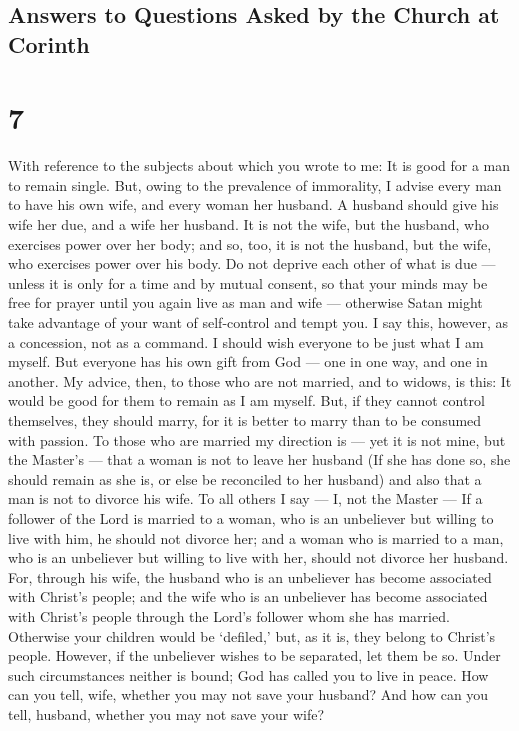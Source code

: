 \hypertarget{answers-to-questions-asked-by-the-church-at-corinth}{%
\subsection{Answers to Questions Asked by the Church at
Corinth}\label{answers-to-questions-asked-by-the-church-at-corinth}}

\hypertarget{section-6}{%
\section{7}\label{section-6}}

 With reference to the subjects about which you wrote to me:
It is good for a man to remain single.  But, owing to the
prevalence of immorality, I advise every man to have his own wife, and
every woman her husband.  A husband should give his wife her
due, and a wife her husband.  It is not the wife, but the
husband, who exercises power over her body; and so, too, it is not the
husband, but the wife, who exercises power over his body. 
Do not deprive each other of what is due --- unless it is only for a
time and by mutual consent, so that your minds may be free for prayer
until you again live as man and wife --- otherwise Satan might take
advantage of your want of self-control and tempt you.  I say
this, however, as a concession, not as a command.  I should
wish everyone to be just what I am myself. But everyone has his own gift
from God --- one in one way, and one in another.  My advice,
then, to those who are not married, and to widows, is this: It would be
good for them to remain as I am myself.  But, if they cannot
control themselves, they should marry, for it is better to marry than to
be consumed with passion.  To those who are married my
direction is --- yet it is not mine, but the Master's --- that a woman
is not to leave her husband  (If she has done so, she
should remain as she is, or else be reconciled to her husband) and also
that a man is not to divorce his wife.  To all others I say
--- I, not the Master --- If a follower of the Lord is married to a
woman, who is an unbeliever but willing to live with him, he should not
divorce her;  and a woman who is married to a man, who is
an unbeliever but willing to live with her, should not divorce her
husband.  For, through his wife, the husband who is an
unbeliever has become associated with Christ's people; and the wife who
is an unbeliever has become associated with Christ's people through the
Lord's follower whom she has married. Otherwise your children would be
`defiled,' but, as it is, they belong to Christ's people. 
However, if the unbeliever wishes to be separated, let them be so. Under
such circumstances neither is bound; God has called you to live in
peace.  How can you tell, wife, whether you may not save
your husband? And how can you tell, husband, whether you may not save
your wife?

